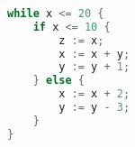 \begin{lstlisting}[language=C++,basicstyle=\ttfamily,keywordstyle=\color{blue}]  % Start your code-block
	
while x <= 20 {
    if x <= 10 {
        z := x;
        x := x + y;
        y := y + 1;
    } else {
        x := x + 2;
        y := y - 3;
    }
}
	\end{lstlisting}